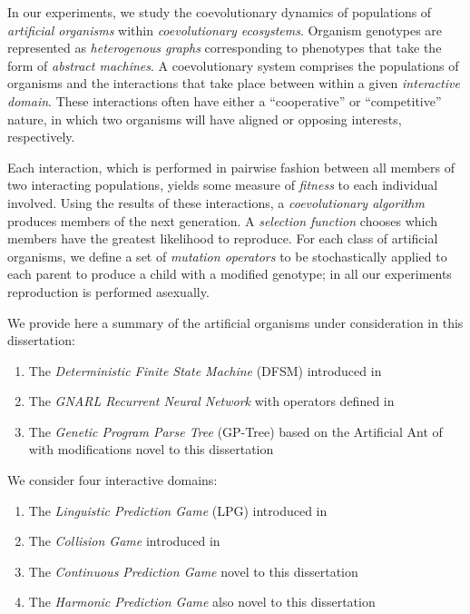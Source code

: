 \documentclass{article}
\begin{document}
In our experiments, we study the coevolutionary dynamics of populations of 
\textit{artificial organisms} within \textit{coevolutionary ecosystems}.
Organism genotypes are represented as \textit{heterogenous graphs} corresponding to phenotypes
that take the form of \textit{abstract machines}. A coevolutionary system comprises the populations
of organisms and the interactions that take place between within a given \textit{interactive domain}.
These interactions often have either a ``cooperative'' or ``competitive'' nature, in which two
organisms will have aligned or opposing interests, respectively.

Each interaction, which is performed in pairwise fashion between all members of two interacting populations, 
yields some measure of \textit{fitness} to each individual involved. Using the results of these 
interactions, a \textit{coevolutionary algorithm} 
produces members of the next generation. A \textit{selection function} chooses which members
have the greatest likelihood to reproduce. For each class of artificial organisms, we define a set 
of \textit{mutation operators} to be stochastically applied to each parent to produce a child
with a modified genotype; in all our experiments reproduction is performed asexually.

We provide here a summary of the artificial organisms under consideration in this dissertation:
\begin{enumerate}
    \item The \textit{Deterministic Finite State Machine} (DFSM) introduced in \citet{moran2019evolving}
    \item The \textit{GNARL Recurrent Neural Network} with operators defined in \citet{willkens2022}
    \item The \textit{Genetic Program Parse Tree} (GP-Tree) based on the Artificial Ant of \citet{Koza92} with 
        modifications novel to this dissertation
\end{enumerate}

We consider four interactive domains:
\begin{enumerate}
    \item The \textit{Linguistic Prediction Game} (LPG) introduced in \citet{moran2019evolving}
    \item The \textit{Collision Game} introduced in \citet{willkens2022}
    \item The \textit{Continuous Prediction Game} novel to this dissertation
    \item The \textit{Harmonic Prediction Game} also novel to this dissertation
\end{enumerate}
\end{document}
